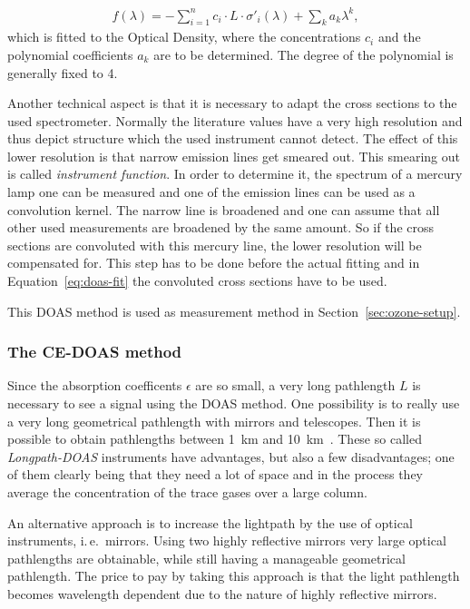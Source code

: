 \begin{align}
  f(\lambda) = - \sum_{i=1}^n c_i \cdot L \cdot \sigma'_i(\lambda) +
  \sum_k a_k \lambda^k \label{eq:doas-fit},
\end{align}
which is fitted to the Optical Density, where the concentrations $c_i$
and the polynomial coefficients $a_k$ are to be determined. The degree
of the polynomial is generally fixed to \num{4}.

Another technical aspect is that it is necessary to adapt the cross
sections to the used spectrometer. Normally the literature values have
a very high resolution and thus depict structure which the used
instrument cannot detect. The effect of this lower resolution is that
narrow emission lines get smeared out. This smearing out is called
\emph{instrument function}. In order to determine it, the spectrum of
a mercury lamp one can be measured and one of the emission lines can
be used as a convolution kernel. The narrow line is broadened and one
can assume that all other used measurements are broadened by the same
amount. So if the cross sections are convoluted with this mercury
line, the lower resolution will be compensated for. This step has to
be done before the actual fitting and in Equation~\eqref{eq:doas-fit}
the convoluted cross sections have to be used.

This DOAS method is used as measurement method in
Section~\ref{sec:ozone-setup}. 

\subsubsection{The CE-DOAS method}
\label{sec:ce-doas}

Since the absorption coefficents $\epsilon$ are so small, a very long
pathlength $L$ is necessary to see a signal using the DOAS method. One
possibility is to really use a very long geometrical pathlength with
mirrors and telescopes. Then it is possible to obtain pathlengths
between \SI{1}{\kilo\meter} and
\SI{10}{\kilo\meter}~\cite{platt}. These so called
\emph{Longpath-DOAS} instruments have advantages, but also a few
disadvantages; one of them clearly being that they need a lot of space
and in the process they average the concentration of the trace gases
over a large column.

An alternative approach is to increase the lightpath by the use of
optical instruments, i.\,e.\ mirrors. Using two highly reflective
mirrors very large optical pathlengths are obtainable, while still
having a manageable geometrical pathlength. The price to pay by
taking this approach is that the light pathlength becomes
wavelength dependent due to the nature of highly reflective mirrors.

